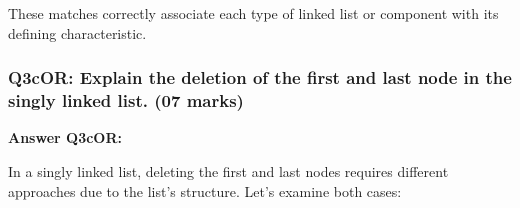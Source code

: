 These matches correctly associate each type of linked list or component
with its defining characteristic.

\hypertarget{q3cor-explain-the-deletion-of-the-first-and-last-node-in-the-singly-linked-list.-07-marks}{%
\subsubsection{\texorpdfstring{Q3cOR: Explain the deletion of the first
and last node in the singly linked list. (\textbf{07
marks})}{Q3cOR: Explain the deletion of the first and last node in the singly linked list. (07 marks)}}\label{q3cor-explain-the-deletion-of-the-first-and-last-node-in-the-singly-linked-list.-07-marks}}

\textbf{Answer Q3cOR:}

In a singly linked list, deleting the first and last nodes requires
different approaches due to the list's structure. Let's examine both
cases:

